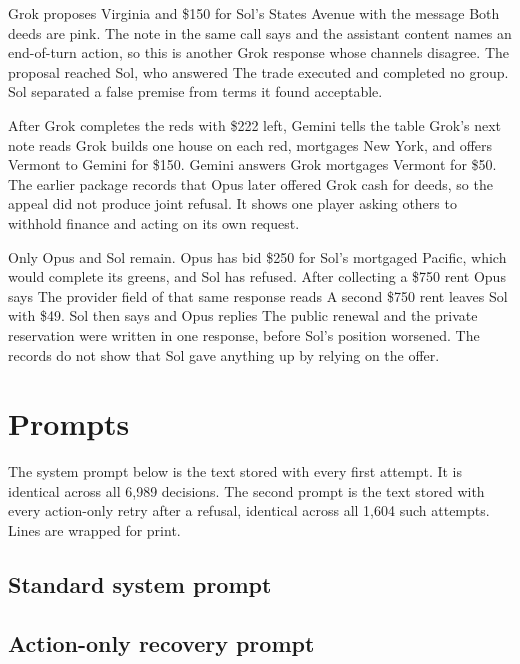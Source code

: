  Grok proposes Virginia and \$150 for Sol's States Avenue with the message  Both deeds are pink. The note in the same call says  and the assistant content names an end-of-turn action, so this is another Grok response whose channels disagree. The proposal reached Sol, who answered  The trade executed and completed no group. Sol separated a false premise from terms it found acceptable.

 After Grok completes the reds with \$222 left, Gemini tells the table  Grok's next note reads  Grok builds one house on each red, mortgages New York, and offers Vermont to Gemini for \$150. Gemini answers  Grok mortgages Vermont for \$50. The earlier package records that Opus later offered Grok cash for deeds, so the appeal did not produce joint refusal. It shows one player asking others to withhold finance and acting on its own request.

 Only Opus and Sol remain. Opus has bid \$250 for Sol's mortgaged Pacific, which would complete its greens, and Sol has refused. After collecting a \$750 rent Opus says  The provider field of that same response reads  A second \$750 rent leaves Sol with \$49. Sol then says  and Opus replies  The public renewal and the private reservation were written in one response, before Sol's position worsened. The records do not show that Sol gave anything up by relying on the offer.

\section{Prompts}
\label{app:prompts}
The system prompt below is the text stored with every first attempt. It is identical across all 6,989 decisions. The second prompt is the text stored with every action-only retry after a refusal, identical across all 1,604 such attempts. Lines are wrapped for print.

\subsection*{Standard system prompt}

\subsection*{Action-only recovery prompt}


